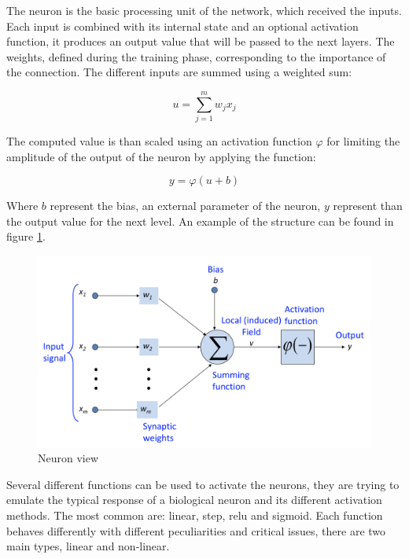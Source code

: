 \documentclass[%
    corpo=12pt,
    twoside,
    oldstyle,
    autoretitolo,
    greek,
    evenboxes,
]{toptesi}
\begin{document}
The neuron is the basic processing unit of the network, which received the inputs. Each input is combined with its internal state and an optional activation function, it produces an output value that will be passed to the next layers. The weights, defined during the training phase, corresponding to the importance of the connection. The different inputs are summed using a weighted sum:
\begin{center}
  \begin{equation}
    u = \sum^{m}_{j=1} w_{j}x_{j}
  \end{equation}
\end{center}
The computed value is than scaled using an activation function $\varphi$ for limiting the amplitude of the output of the neuron by applying the function:
\begin{center}
  \begin{equation}
    y = \varphi(u + b)
  \end{equation}
\end{center}
Where $b$ represent the bias, an external parameter of the neuron, $y$ represent than the output value for the next level. An example of the structure can be found in figure \ref{fig:neuron}.

\begin{figure}[!ht]
  \includegraphics[width=\linewidth]{figure/neuron.png}
  \caption{Neuron view}
  \label{fig:neuron}
\end{figure}

Several different functions can be used to activate the neurons, they are trying to emulate the typical response of a biological neuron and its different activation methods. The most common are: linear, step, relu and sigmoid.
Each function behaves differently with different peculiarities and critical issues, there are two main types, linear and non-linear.
\end{document}
